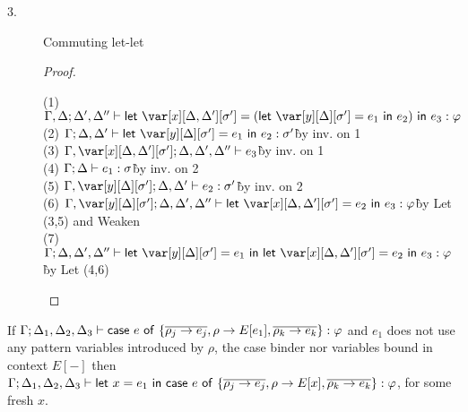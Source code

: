\begin{description}
\item[3.] Commuting let-let
\begin{proof}~
\begin{tabbing}
    (1) $\G, \D;\D',\D'' \vdash \llet{\x[\D,\D'][\s'] = (\llet{\yD = e_1}{e_2})}{e_3} : \vp$\\
    (2) $\G; \D, \D' \vdash \llet{\yD = e_1}{e_2} : \s'$\`by inv. on 1\\
    (3) $\G, \x[\D,\D'][\s'];\D,\D',\D'' \vdash e_3$\`by inv. on 1\\
    (4) $\Gamma; \Delta \vdash e_1 : \sigma$\`by inv. on 2\\
    (5) $\G, \yD; \D,\D' \vdash e_2 : \s'$\`by inv. on 2\\
    (6) $\G, \yD; \D,\D',\D'' \vdash \llet{\x[\D,\D'][\s'] = e_2}{e_3} : \vp$\`by Let (3,5) and Weaken\\
    (7) $\G; \D,\D',\D'' \vdash \llet{\yD = e_1}{\llet{\x[\D,\D'][\s'] = e_2}{e_3}} : \vp$\`by Let (4,6)\\
\end{tabbing}
\end{proof}
\end{description}




\begin{theorem}
If $\Gamma; \Delta_1,\Delta_2,\Delta_3 \vdash \mathsf{case}~e~\mathsf{of}~\{\overline{\rho_j\to e_j}, \rho \to
  E[e_1], \overline{\rho_k\to e_k}\}  : \varphi$ and $e_1$ does not
use any pattern variables introduced by $\rho$, the case binder nor variables bound in
context $E[{-}]$
then 
$\Gamma ; \Delta_1,\Delta_2,\Delta_3  \vdash \mathsf{let}~x = e_1~\mathsf{in}~\mathsf{case}~e~\mathsf{of}~\{\overline{\rho_j\to
           e_j}, \rho \to E[x], \overline{\rho_k\to e_k}\} : \varphi$,
     for some fresh $x$.
              
   \end{theorem}
   
